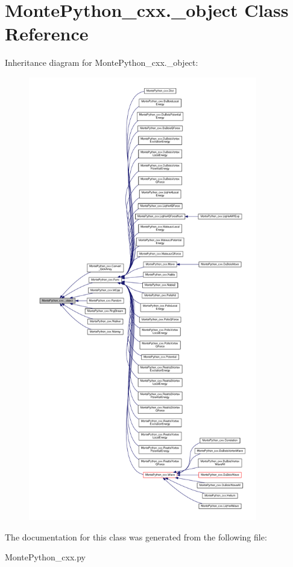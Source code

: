 \hypertarget{classMontePython__cxx_1_1__object}{}\section{Monte\+Python\+\_\+cxx.\+\_\+object Class Reference}
\label{classMontePython__cxx_1_1__object}


Inheritance diagram for Monte\+Python\+\_\+cxx.\+\_\+object\+:
\nopagebreak
\begin{figure}[H]
\begin{center}
\leavevmode
\includegraphics[height=550pt]{classMontePython__cxx_1_1__object__inherit__graph}
\end{center}
\end{figure}


The documentation for this class was generated from the following file\+:\begin{DoxyCompactItemize}
\item 
Monte\+Python\+\_\+cxx.\+py\end{DoxyCompactItemize}
